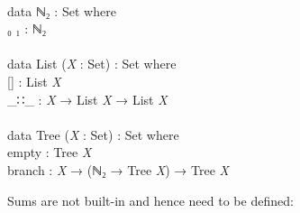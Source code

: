 \documentclass{entcs} \usepackage{prentcsmacro}
\newcommand{\AgdaFontStyle}[1]{\textsf{#1}}
\newcommand{\AgdaBoundFontStyle}[1]{\textit{#1}}
\newcommand{\AgdaKeyword}     [1]
    {\AgdaFontStyle{\textcolor{AgdaKeyword}{#1}}}
\newcommand{\AgdaSymbol}      [1]{\textcolor{AgdaSymbol}{#1}}
\newcommand{\AgdaPrimitiveType}[1]
    {\AgdaFontStyle{\textcolor{AgdaPrimitiveType}{#1}}}
\newcommand{\AgdaBound}    [1]{\AgdaBoundFontStyle{\textcolor{AgdaBound}{#1}}}
\newcommand{\AgdaInductiveConstructor}[1]
    {\AgdaFontStyle{\textcolor{AgdaInductiveConstructor}{#1}}}
\newcommand{\AgdaDatatype} [1]{\AgdaFontStyle{\textcolor{AgdaDatatype}{#1}}}
\newcommand{\AgdaIndent}[1]{\quad}
\newcommand{\AgdaCodeStyle}{\small}
\newenvironment{code}%
{\noindent\AgdaCodeStyle\pboxed}%
{\endpboxed\par\noindent%
\ignorespacesafterend}
\begin{document}
\begin{code}\>\<%
\\
\>\AgdaKeyword{data} \AgdaDatatype{ℕ₂} \AgdaSymbol{:} \AgdaPrimitiveType{Set} \AgdaKeyword{where}\<%
\\
\>[0]\AgdaIndent{2}{}\<[2]%
\>[2]\AgdaInductiveConstructor{₀} \AgdaInductiveConstructor{₁} \AgdaSymbol{:} \AgdaDatatype{ℕ₂}\<%
\\
%
\\
\>\AgdaKeyword{data} \AgdaDatatype{List} \AgdaSymbol{(}\AgdaBound{X} \AgdaSymbol{:} \AgdaPrimitiveType{Set}\AgdaSymbol{)} \AgdaSymbol{:} \AgdaPrimitiveType{Set} \AgdaKeyword{where}\<%
\\
\>[0]\AgdaIndent{2}{}\<[2]%
\>[2]\AgdaInductiveConstructor{[]} \<[12]%
\>[12]\AgdaSymbol{:} \AgdaDatatype{List} \AgdaBound{X}\<%
\\
\>[0]\AgdaIndent{2}{}\<[2]%
\>[2]\AgdaInductiveConstructor{\_∷\_} \AgdaSymbol{:} \AgdaBound{X} \AgdaSymbol{→} \AgdaDatatype{List} \AgdaBound{X} \AgdaSymbol{→} \AgdaDatatype{List} \AgdaBound{X}\<%
\\
%
\\
\>\AgdaKeyword{data} \AgdaDatatype{Tree} \AgdaSymbol{(}\AgdaBound{X} \AgdaSymbol{:} \AgdaPrimitiveType{Set}\AgdaSymbol{)} \AgdaSymbol{:} \AgdaPrimitiveType{Set} \AgdaKeyword{where}\<%
\\
\>[0]\AgdaIndent{2}{}\<[2]%
\>[2]\AgdaInductiveConstructor{empty} \AgdaSymbol{:} \AgdaDatatype{Tree} \AgdaBound{X}\<%
\\
\>[0]\AgdaIndent{2}{}\<[2]%
\>[2]\AgdaInductiveConstructor{branch} \AgdaSymbol{:} \AgdaBound{X} \AgdaSymbol{→} \AgdaSymbol{(}\AgdaDatatype{ℕ₂} \AgdaSymbol{→} \AgdaDatatype{Tree} \AgdaBound{X}\AgdaSymbol{)} \AgdaSymbol{→} \AgdaDatatype{Tree} \AgdaBound{X}\<%
\\
\>\<\end{code}
Sums are not built-in and hence need to be defined:
\end{document}
